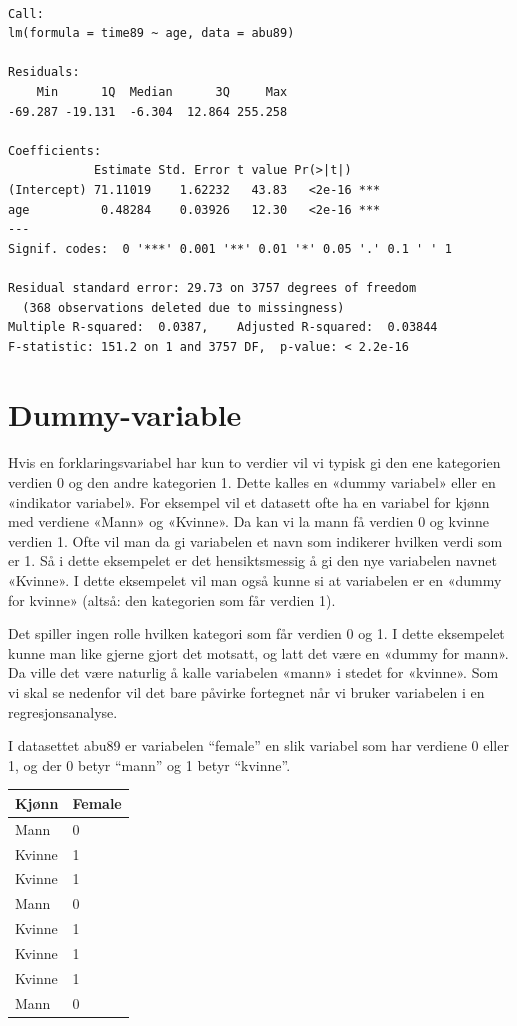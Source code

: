 \documentclass[
  norsk,
  letterpaper,
  DIV=11,
  numbers=noendperiod]{scrreprt}
\theoremstyle{definition}
\theoremstyle{remark}
\begin{document}
\begin{verbatim}

Call:
lm(formula = time89 ~ age, data = abu89)

Residuals:
    Min      1Q  Median      3Q     Max 
-69.287 -19.131  -6.304  12.864 255.258 

Coefficients:
            Estimate Std. Error t value Pr(>|t|)    
(Intercept) 71.11019    1.62232   43.83   <2e-16 ***
age          0.48284    0.03926   12.30   <2e-16 ***
---
Signif. codes:  0 '***' 0.001 '**' 0.01 '*' 0.05 '.' 0.1 ' ' 1

Residual standard error: 29.73 on 3757 degrees of freedom
  (368 observations deleted due to missingness)
Multiple R-squared:  0.0387,    Adjusted R-squared:  0.03844 
F-statistic: 151.2 on 1 and 3757 DF,  p-value: < 2.2e-16
\end{verbatim}

\section{Dummy-variable}\label{dummy-variable}

Hvis en forklaringsvariabel har kun to verdier vil vi typisk gi den ene
kategorien verdien 0 og den andre kategorien 1. Dette kalles en «dummy
variabel» eller en «indikator variabel». For eksempel vil et datasett
ofte ha en variabel for kjønn med verdiene «Mann» og «Kvinne». Da kan vi
la mann få verdien 0 og kvinne verdien 1. Ofte vil man da gi variabelen
et navn som indikerer hvilken verdi som er 1. Så i dette eksempelet er
det hensiktsmessig å gi den nye variabelen navnet «Kvinne». I dette
eksempelet vil man også kunne si at variabelen er en «dummy for kvinne»
(altså: den kategorien som får verdien 1).

Det spiller ingen rolle hvilken kategori som får verdien 0 og 1. I dette
eksempelet kunne man like gjerne gjort det motsatt, og latt det være en
«dummy for mann». Da ville det være naturlig å kalle variabelen «mann» i
stedet for «kvinne». Som vi skal se nedenfor vil det bare påvirke
fortegnet når vi bruker variabelen i en regresjonsanalyse.

I datasettet abu89 er variabelen ``female'' en slik variabel som har
verdiene 0 eller 1, og der 0 betyr ``mann'' og 1 betyr ``kvinne''.

\begin{longtable}[]{@{}ll@{}}
\toprule\noalign{}
Kjønn & Female \\
\midrule\noalign{}
\endhead
\bottomrule\noalign{}
\endlastfoot
Mann & 0 \\
Kvinne & 1 \\
Kvinne & 1 \\
Mann & 0 \\
Kvinne & 1 \\
Kvinne & 1 \\
Kvinne & 1 \\
Mann & 0 \\
\end{longtable}
\end{document}
